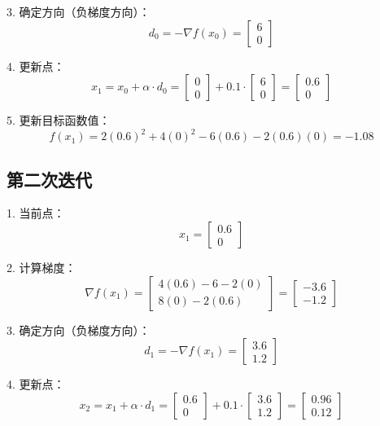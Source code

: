 \documentclass[12pt,a4paper,oneside]{article}
\begin{document}
3. 确定方向（负梯度方向）：
\[
d_0 = -\nabla f(x_0) = 
\begin{bmatrix}
6 \\
0
\end{bmatrix}
\]

4. 更新点：
\[
x_1 = x_0 + \alpha \cdot d_0 = 
\begin{bmatrix}
0 \\
0
\end{bmatrix} + 0.1 \cdot 
\begin{bmatrix}
6 \\
0
\end{bmatrix} = 
\begin{bmatrix}
0.6 \\
0
\end{bmatrix}
\]

5. 更新目标函数值：
\[
f(x_1) = 2(0.6)^2 + 4(0)^2 - 6(0.6) - 2(0.6)(0) = -1.08
\]

\subsection*{第二次迭代}

1. 当前点：
\[
x_1 = \begin{bmatrix} 0.6 \\ 0 \end{bmatrix}
\]

2. 计算梯度：
\[
\nabla f(x_1) = 
\begin{bmatrix}
4(0.6) - 6 - 2(0) \\
8(0) - 2(0.6)
\end{bmatrix} = 
\begin{bmatrix}
-3.6 \\
-1.2
\end{bmatrix}
\]

3. 确定方向（负梯度方向）：
\[
d_1 = -\nabla f(x_1) = 
\begin{bmatrix}
3.6 \\
1.2
\end{bmatrix}
\]

4. 更新点：
\[
x_2 = x_1 + \alpha \cdot d_1 = 
\begin{bmatrix}
0.6 \\
0
\end{bmatrix} + 0.1 \cdot 
\begin{bmatrix}
3.6 \\
1.2
\end{bmatrix} = 
\begin{bmatrix}
0.96 \\
0.12
\end{bmatrix}
\]
\end{document}
